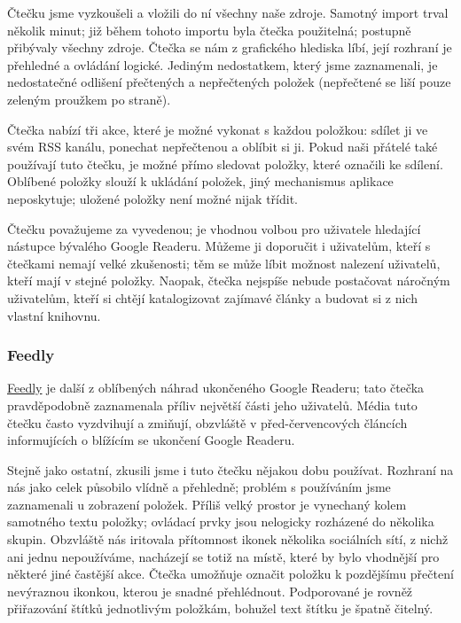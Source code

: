 Čtečku jsme vyzkoušeli a vložili do ní všechny naše zdroje.
Samotný import trval několik minut; již během tohoto importu byla čtečka použitelná; postupně přibývaly všechny zdroje.
Čtečka se nám z grafického hlediska líbí, její rozhraní je přehledné a ovládání logické.
Jediným nedostatkem, který jsme zaznamenali, je nedostatečné odlišení přečtených a nepřečtených položek (nepřečtené se liší pouze zeleným proužkem po straně).

Čtečka nabízí tři akce, které je možné vykonat s každou položkou: sdílet ji ve svém RSS kanálu, ponechat nepřečtenou a oblíbit si ji.
Pokud naši přátelé také používají tuto čtečku, je možné přímo sledovat položky, které označili ke sdílení.
Oblíbené položky slouží k ukládání položek, jiný mechanismus aplikace neposkytuje; uložené položky není možné nijak třídit.

Čtečku považujeme za vyvedenou; je vhodnou volbou pro uživatele hledající nástupce bývalého Google Readeru.
Můžeme ji doporučit i uživatelům, kteří s čtečkami nemají velké zkušenosti; těm se může líbit možnost nalezení uživatelů, kteří mají v  stejné položky.
Naopak, čtečka nejspíše nebude postačovat náročným uživatelům, kteří si chtějí katalogizovat zajímavé články a budovat si z nich vlastní knihovnu.

\subsubsection{Feedly}

\href{http://www.feedly.com/}{Feedly} je další z oblíbených náhrad ukončeného Google Readeru; tato čtečka pravděpodobně zaznamenala příliv největší části jeho uživatelů.
Média tuto čtečku často vyzdvihují a zmiňují, obzvláště v před-červencových článcích informujících o blížícím se ukončení Google Readeru.

Stejně jako ostatní, zkusili jsme i tuto čtečku nějakou dobu používat.
Rozhraní na nás jako celek působilo vlídně a přehledně; problém s používáním jsme zaznamenali u zobrazení položek.
Příliš velký prostor je vynechaný kolem samotného textu položky; ovládací prvky jsou nelogicky rozházené do několika skupin.
Obzvláště nás iritovala přítomnost ikonek několika sociálních sítí, z nichž ani jednu nepoužíváme, nacházejí se totiž na místě, které by bylo vhodnější pro některé jiné častější akce.
Čtečka umožňuje označit položku k pozdějšímu přečtení nevýraznou ikonkou, kterou je snadné přehlédnout.
Podporované je rovněž přiřazování štítků jednotlivým položkám, bohužel text štítku je špatně čitelný.

